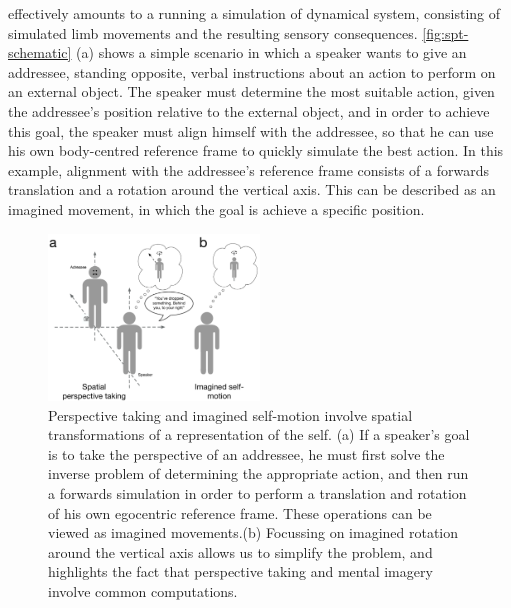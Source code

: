 \documentclass[english,floatsintext,man]{apa6}
\theoremstyle{definition}
\theoremstyle{definition}
\theoremstyle{remark}
\begin{document}
effectively amounts to a running a simulation of dynamical system,
consisting of simulated limb movements and the resulting sensory
consequences. \autoref{fig:spt-schematic} (a) shows a simple scenario in
which a speaker wants to give an addressee, standing opposite, verbal
instructions about an action to perform on an external object. The
speaker must determine the most suitable action, given the addressee's
position relative to the external object, and in order to achieve this
goal, the speaker must align himself with the addressee, so that he can
use his own body-centred reference frame to quickly simulate the best
action. In this example, alignment with the addressee's reference frame
consists of a forwards translation and a rotation around the vertical
axis. This can be described as an imagined movement, in which the goal
is achieve a specific position.

\begin{figure}
\centering
\includegraphics[width=0.50000\textwidth]{diagrams/fig-1-common-process.pdf}
\caption{Perspective taking and imagined self-motion involve spatial
transformations of a representation of the self. (a) If a speaker's goal
is to take the perspective of an addressee, he must first solve the
inverse problem of determining the appropriate action, and then run a
forwards simulation in order to perform a translation and rotation of
his own egocentric reference frame. These operations can be viewed as
imagined movements.(b) Focussing on imagined rotation around the
vertical axis allows us to simplify the problem, and highlights the fact
that perspective taking and mental imagery involve common
computations.\label{fig:spt-schematic}}
\end{figure}
\end{document}
